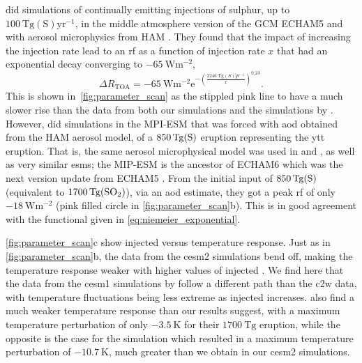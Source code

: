 \documentclass{ametsocV6.1}
\newcommand{\iso}[1][i]{{#1}njected \ce{SO2}}
\begin{document}
\citet{niemeier2015} did simulations of continually emitting injections of sulphur, up
to \(\SI{100}{\tera\gram \mathrm{(S)}\mathrm{yr}^{-1}}\), in the middle atmosphere
version of the GCM ECHAM5 \citep{giorgetta2006} and with aerosol microphysics from HAM
\citep{stier2005}. They found that the impact of increasing the injection rate lead to
an \gls{rf} as a function of injection rate \(x\) that had an exponential decay
converging to \(\SI{-65}{\watt\meter^{-2}}\),
\begin{equation}
  \Delta
  R_{\mathrm{TOA}} =
  -\SI{65}{\watt\metre^{-2}}
  \mathrm{e}^{-{\left(\frac{\SI{2246}{\tera\gram(S)yr^{-1}}}{x}\right)}^{0.23}}.
  \label{eq:niemeier_exponential}
\end{equation}
%
This is shown in~\ref{fig:parameter_scan} as the stippled pink line to have a much
slower rise than the data from both our simulations and the simulations by
\citet{ottobliesner2016}. However, \citet{timmreck2010} did simulations in the MPI-ESM
that was forced with \gls{aod} obtained from the HAM aerosol model, of a
\(\SI{850}{\tera\gram(\ce{S})}\) eruption representing the \gls{ytt} eruption. That is,
the same aerosol microphysical model was used in \citet{timmreck2010} and
\citet{niemeier2015}, as well as very similar \glspl{esm}; the MIP-ESM is the ancestor
of ECHAM6 which was the next version update from ECHAM5 \citep{kuma2023}. From the
initial input of \(\SI{850}{\tera\gram(\ce{S})}\) (equivalent to
\(\SI{1700}{\tera\gram(\ce{SO2})}\)), via an \gls{aod} estimate, they got a peak
\gls{rf} of only \(\SI{-18}{\watt\metre^{-2}}\) (pink filled circle in
\ref{fig:parameter_scan}b). This is in good agreement with the functional given in
\ref{eq:niemeier_exponential}.

\ref{fig:parameter_scan}c show \iso{} versus temperature response. Just as in
\ref{fig:parameter_scan}b, the data from the \gls{cesm2} simulations bend off, making
the temperature response weaker with higher values of \iso. We find here that the data
from the \gls{cesm1} simulations by \citet{ottobliesner2016} follow a different path
than the \gls{c2w} data, with temperature fluctuations being less extreme as \iso{}
increases. \citet{timmreck2010} also find a much weaker temperature response than our
results suggest, with a maximum temperature perturbation of only \(\SI{-3.5}{\kelvin}\)
for their \(\SI{1700}{\tera\gram}\)  eruption, while the opposite is the case
for the \citet{jones2005} simulation which resulted in a maximum temperature
perturbation of \(\SI{-10.7}{\kelvin}\), much greater than we obtain in our \gls{cesm2}
simulations.
\end{document}

